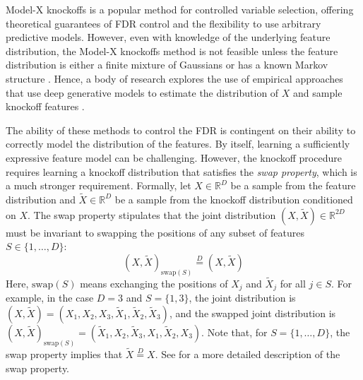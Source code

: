 \documentclass{article}
\begin{document}
Model-X knockoffs \citep{candesPanningGoldModelX2018} is a popular method for controlled variable selection, offering theoretical guarantees of FDR control and the flexibility to use arbitrary predictive models.
However, even with knowledge of the underlying feature distribution, the Model-X knockoffs method is not feasible unless the feature distribution is either a finite mixture of Gaussians \citep{giminezKnockoffsMassNew2019} or has a known Markov structure \citep{batesMetropolizedKnockoffSampling2020}.
Hence, a body of research explores the use of empirical approaches that use deep generative models to estimate the distribution of $X$ and sample knockoff features \citep{jordon2018knockoffgan, liuAutoEncodingKnockoffGenerator2018, romanoDeepKnockoffs2018, sudarshanDeepDirectLikelihood2020}.


The ability of these methods to control the FDR is contingent on their ability to correctly model the distribution of the features.
By itself, learning a sufficiently expressive feature model can be challenging.
However, the knockoff procedure requires learning a knockoff distribution that satisfies the \textit{swap property}, which is a much stronger requirement.
Formally, let $X \in \mathbb R^D$ be a sample from the feature distribution and $\tilde X \in \mathbb R^D$ be a sample from the knockoff distribution conditioned on $X$.
The swap property stipulates that the joint distribution $(X, \tilde X) \in \mathbb{R}^{2D}$ must be invariant to swapping the positions of any subset of features $S \in \{1, \dots, D\}$:
\begin{equation}
    (X, \tilde X)_{\text{swap}(S)} \overset D = (X, \tilde X)
\end{equation}
Here, $\text{swap}(S)$ means exchanging the positions of $X_j$ and $\tilde X_j$ for all $j \in S$.
For example, in the case $D=3$ and $S=\{1, 3\}$, the joint distribution is $(X, \tilde X) = (X_1, X_2, X_3, \tilde X_1, \tilde X_2, \tilde X_3)$, and the swapped joint distribution is $(X, \tilde X)_{\text{swap}(S)} = (\tilde X_1, X_2, \tilde X_3, X_1, \tilde X_2, X_3)$.
Note that, for $S=\{1, \dots, D\}$, the swap property implies that $\tilde X \overset D = X$.
See \citet{candesPanningGoldModelX2018} for a more detailed description of the swap property.
\end{document}
